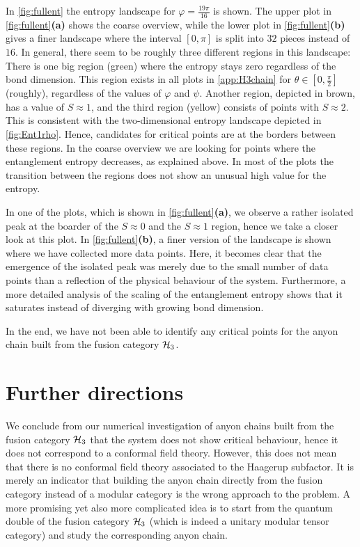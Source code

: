 In \cref{fig:fullent} the entropy landscape for $\varphi=\frac{19\pi}{16}$ is shown. The upper plot in \cref{fig:fullent}\textbf{(a)} shows the coarse overview, while the lower plot in \cref{fig:fullent}\textbf{(b)} gives a finer landscape where the interval $[0,\pi]$ is split into $32$ pieces instead of $16$. In general, there seem to be roughly three different regions in this landscape: There is one big region (green) where the entropy stays zero regardless of the bond dimension. This region exists in all plots in \cref{app:H3chain} for $\theta\in[0,\frac{\pi}{2}]$ (roughly), regardless of the values of $\varphi$ and $\psi$. Another region, depicted in brown, has a value of $S\approx 1$, and the third region (yellow) consists of points with $S\approx 2$. This is consistent with the two-dimensional entropy landscape depicted in \cref{fig:Ent1rho}. Hence, candidates for critical points are at the borders between these regions. In the coarse overview we are looking for points where the entanglement entropy decreases, as explained above. In most of the plots the transition between the regions does not show an unusual high value for the entropy. 

In one of the plots, which is shown in \cref{fig:fullent}\textbf{(a)}, we observe a rather isolated peak at the boarder of the $S\approx 0$ and the $S\approx 1$ region, hence we take a closer look at this plot. In \cref{fig:fullent}\textbf{(b)}, a finer version of the landscape is shown where we have collected more data points. Here, it becomes clear that the emergence of the isolated peak was merely due to the small number of data points than a reflection of the physical behaviour of the system. Furthermore, a more detailed analysis of the scaling of the entanglement entropy shows that it saturates instead of diverging with growing bond dimension.

In the end, we have not been able to identify any critical points for the anyon chain built from the fusion category ${\mathcal{H}_3}$.


\section{Further directions}

We conclude from our numerical investigation of anyon chains built from the fusion category ${\mathcal{H}_3}$ that the system does not show critical behaviour, hence it does not correspond to a conformal field theory. However, this does not mean that there is no conformal field theory associated to the Haagerup subfactor. It is merely an indicator that building the anyon chain directly from the fusion category instead of a modular category is the wrong approach to the problem. A more promising yet also more complicated idea is to start from the quantum double of the fusion category ${\mathcal{H}_3}$ (which is indeed a unitary modular tensor category) and study the corresponding anyon chain. 

